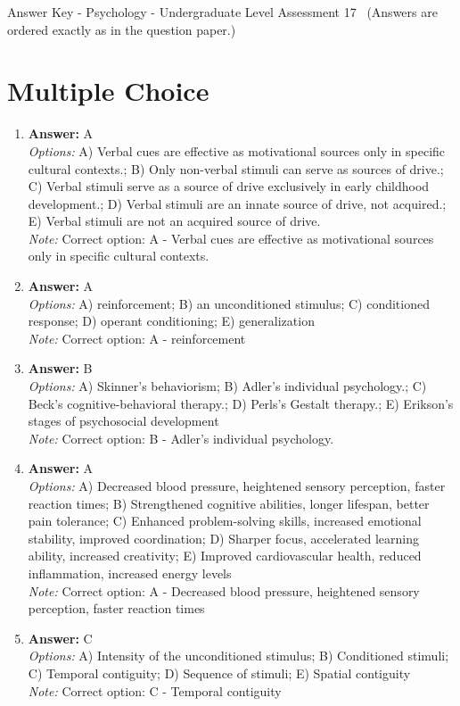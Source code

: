 \documentclass[12pt]{article}
\begin{document}
\begin{center}
Answer Key - Psychology - Undergraduate Level Assessment 17 \
\small (Answers are ordered exactly as in the question paper.)
\end{center}

\section*{Multiple Choice}
\begin{enumerate}[label=\arabic*.]
\item \textbf{Answer:} A
\\ \textit{Options:} A) Verbal cues are effective as motivational sources only in specific cultural contexts.; B) Only non-verbal stimuli can serve as sources of drive.; C) Verbal stimuli serve as a source of drive exclusively in early childhood development.; D) Verbal stimuli are an innate source of drive, not acquired.; E) Verbal stimuli are not an acquired source of drive.
\\ \textit{Note:} Correct option: A - Verbal cues are effective as motivational sources only in specific cultural contexts.
\item \textbf{Answer:} A
\\ \textit{Options:} A) reinforcement; B) an unconditioned stimulus; C) conditioned response; D) operant conditioning; E) generalization
\\ \textit{Note:} Correct option: A - reinforcement
\item \textbf{Answer:} B
\\ \textit{Options:} A) Skinner's behaviorism; B) Adler's individual psychology.; C) Beck's cognitive-behavioral therapy.; D) Perls's Gestalt therapy.; E) Erikson's stages of psychosocial development
\\ \textit{Note:} Correct option: B - Adler's individual psychology.
\item \textbf{Answer:} A
\\ \textit{Options:} A) Decreased blood pressure, heightened sensory perception, faster reaction times; B) Strengthened cognitive abilities, longer lifespan, better pain tolerance; C) Enhanced problem-solving skills, increased emotional stability, improved coordination; D) Sharper focus, accelerated learning ability, increased creativity; E) Improved cardiovascular health, reduced inflammation, increased energy levels
\\ \textit{Note:} Correct option: A - Decreased blood pressure, heightened sensory perception, faster reaction times
\item \textbf{Answer:} C
\\ \textit{Options:} A) Intensity of the unconditioned stimulus; B) Conditioned stimuli; C) Temporal contiguity; D) Sequence of stimuli; E) Spatial contiguity
\\ \textit{Note:} Correct option: C - Temporal contiguity
\end{enumerate}
\end{document}
